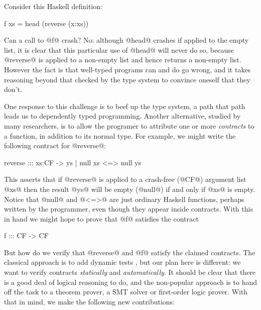 Consider this Haskell definition:
\begin{code}
  f xs = head (reverse (x:xs))
\end{code}
Can a call to @f@ crash?  No: although @head@ crashes if applied to the
empty list, it is clear that this particular use of @head@ will never
do so, because @reverse@ is applied to a non-empty list and
hence returns a non-empty list.  However the fact is that 
well-typed programs can and do go wrong, and it takes reasoning beyond that
checked by the type system to convince oneself that they don't.

One response to this challenge is to beef up the type system, a path that
path leads us to dependently typed programming.  Another alternative,
studied by many researchers, is to allow the programer to attribute one or
more \emph{contracts} to a function, in addition to its normal type.
For example, we might write the following contract for @reverse@:
\begin{code}
reverse ::: xs:CF -> { ys | null xs <=> null ys }
\end{code}
This asserts that if @reverse@ is applied to a crash-free (@CF@) argument list @xs@
then the result @ys@ will be empty (@null@) if and only if @xs@ is empty.
Notice that @null@ and @<=>@ are just ordinary Haskell functions, perhaps
written by the programmer, even though they appear inside contracts.
With this in hand we might hope to prove that @f@ satisfies the contract
\begin{code}
f ::: CF -> CF
\end{code}
But how do we verify that @reverse@ and @f@ satisfy the claimed
contracts.  The classical approach is to add dynamic tests
\cite{finder-felliesen}, but our plan here is different: we want to
verify contracts \emph{statically} and \emph{automatically}.  It
should be clear that there is a good deal of logical reasoning to do,
and the non-popular approach is to hand off the task to a theorem
prover, a SMT solver or first-order logic prover.
With that in mind, we make the following new contributions:
